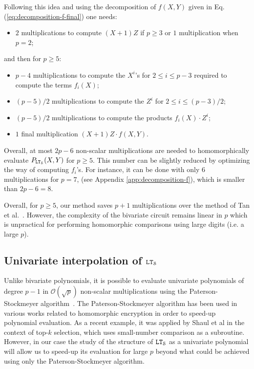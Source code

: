 Following this idea and using the decomposition of $f(X,Y)$ given in Eq. (\ref{eq:decomposition-f-final}) one needs:
\begin{itemize}
\item $2$ multiplications to compute $(X+1)Z$ if $p\geq 3$ or $1$ multiplication when $p=2$;
\end{itemize}
and then for $p\geq 5$:
\begin{itemize}
\item $p-4$ multiplications to compute the $X^i$'s for $2\leq i \leq p-3$ required to compute the terms $f_i(X)$;
\item $(p-5)/2$ multiplications to compute the $Z^i$ for $2\leq i \leq (p-3)/2$;
\item $(p-5)/2$ multiplications to compute the products $f_i(X)\cdot Z^i$;
\item $1$ final multiplication $(X+1)Z\cdot f(X,Y)$.
\end{itemize}
Overall, at most $2p-6$ non-scalar multiplications are needed to homomorphically evaluate $P_{\mathtt{LT}_{\mathcal{S}}}(X,Y)$ for \mbox{$p \geq 5$}. 
This number can be slightly reduced by optimizing the way of computing $f_i$'s. 
For instance, it can be done with only $6$ multiplications for $p=7$, (see Appendix \ref{app:decomposition-f}), which is smaller than $2p-6=8$.

Overall, for $p\geq 5$, our method saves $p+1$ multiplications over the method of Tan et al.~\cite{TLWRK20}. 
However, the complexity of the bivariate circuit remains linear in $p$ which is unpractical for performing homomorphic comparisons using large digits (i.e. a large $p$).
  
\subsection{Univariate interpolation of $\mathtt{LT}_{\mathcal{S}}$}
Unlike bivariate polynomials, it is possible to evaluate univariate polynomials of degree $p-1$ in $\mathcal{O}(\sqrt{p})$ non-scalar multiplications using the Paterson-Stockmeyer algorithm~\cite{SIAM:PS73}. The Paterson-Stockmeyer algorithm has been used in various works related to homomorphic encryption in order to speed-up polynomial evaluation. As a recent example, it was applied by Shaul et al \cite{PoPETS:SFR20} in the context of top-$k$ selection, which uses small-number comparison as a subroutine. However, in our case the study of the structure of $\mathtt{LT}_{\mathcal{S}}$ as a univariate polynomial will allow us to speed-up its evaluation for large $p$ beyond what could be achieved using only the Paterson-Stockmeyer algorithm.


